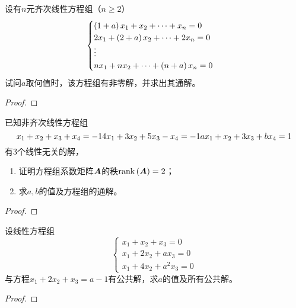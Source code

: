 \begin{problem}\label{problem-2.8}
设有\(n\)元齐次线性方程组（\(n\ge2\)）
\begin{equation*}
    \begin{cases}
        \left( 1+a \right)x_1+x_2+\cdots+x_n=0   \\
        2x_1+\left( 2+a \right)x_2+\cdots+2x_n=0 \\
        \vdots                           \\
        nx_1+nx_2+\cdots+\left( n+a \right)x_n=0
    \end{cases}
\end{equation*}
试问\(a\)取何值时，该方程组有非零解，并求出其通解。
\end{problem}
\begin{proof}
\end{proof}

\begin{problem}\label{problem-2.9}
已知非齐次线性方程组
\begin{equation*}
    x_1+x_2+x_3+x_4=-1\\
    4x_1+3x_2+5x_3-x_4=-1\\
    ax_1+x_2+3x_3+bx_4=1
\end{equation*}
有\(3\)个线性无关的解，
\begin{enumerate}
    \item 证明方程组系数矩阵\(\boldsymbol{A}\)的秩\(\mathrm{rank}\left( \boldsymbol{A} \right)=2\)；
    \item 求\(a,b\)的值及方程组的通解。
\end{enumerate}
\end{problem}
\begin{proof}
\end{proof}

\begin{problem}\label{problem-2.10}
设线性方程组
\begin{equation*}
    \begin{cases}
        x_1+x_2+x_3=0   \\
        x_1+2x_2+ax_3=0 \\
        x_1+4x_2+a^2x_3=0
    \end{cases}
\end{equation*}
与方程\(x_1+2x_2+x_3=a-1\)有公共解，求\(a\)的值及所有公共解。
\end{problem}
\begin{proof}
\end{proof}

